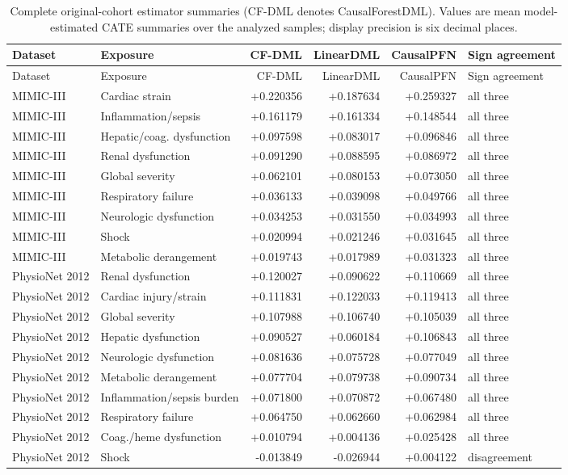 \begin{longtable}{@{}p{0.84in}p{1.42in}rrrp{0.68in}@{}}
\caption{Complete original-cohort estimator summaries (CF-DML denotes CausalForestDML). Values are mean model-estimated CATE summaries over the analyzed samples; display precision is six decimal places.}\label{tab:supp-original-cate}\\
\toprule Dataset & Exposure & CF-DML & LinearDML & CausalPFN & Sign agreement\\
\midrule \endfirsthead
\toprule Dataset & Exposure & CF-DML & LinearDML & CausalPFN & Sign agreement\\
\midrule \endhead
MIMIC-III & Cardiac strain & +0.220356 & +0.187634 & +0.259327 & all three\\
MIMIC-III & Inflammation/sepsis & +0.161179 & +0.161334 & +0.148544 & all three\\
MIMIC-III & Hepatic/coag. dysfunction & +0.097598 & +0.083017 & +0.096846 & all three\\
MIMIC-III & Renal dysfunction & +0.091290 & +0.088595 & +0.086972 & all three\\
MIMIC-III & Global severity & +0.062101 & +0.080153 & +0.073050 & all three\\
MIMIC-III & Respiratory failure & +0.036133 & +0.039098 & +0.049766 & all three\\
MIMIC-III & Neurologic dysfunction & +0.034253 & +0.031550 & +0.034993 & all three\\
MIMIC-III & Shock & +0.020994 & +0.021246 & +0.031645 & all three\\
MIMIC-III & Metabolic derangement & +0.019743 & +0.017989 & +0.031323 & all three\\
PhysioNet 2012 & Renal dysfunction & +0.120027 & +0.090622 & +0.110669 & all three\\
PhysioNet 2012 & Cardiac injury/strain & +0.111831 & +0.122033 & +0.119413 & all three\\
PhysioNet 2012 & Global severity & +0.107988 & +0.106740 & +0.105039 & all three\\
PhysioNet 2012 & Hepatic dysfunction & +0.090527 & +0.060184 & +0.106843 & all three\\
PhysioNet 2012 & Neurologic dysfunction & +0.081636 & +0.075728 & +0.077049 & all three\\
PhysioNet 2012 & Metabolic derangement & +0.077704 & +0.079738 & +0.090734 & all three\\
PhysioNet 2012 & Inflammation/sepsis burden & +0.071800 & +0.070872 & +0.067480 & all three\\
PhysioNet 2012 & Respiratory failure & +0.064750 & +0.062660 & +0.062984 & all three\\
PhysioNet 2012 & Coag./heme dysfunction & +0.010794 & +0.004136 & +0.025428 & all three\\
PhysioNet 2012 & Shock & -0.013849 & -0.026944 & +0.004122 & disagreement\\
\bottomrule \end{longtable}

